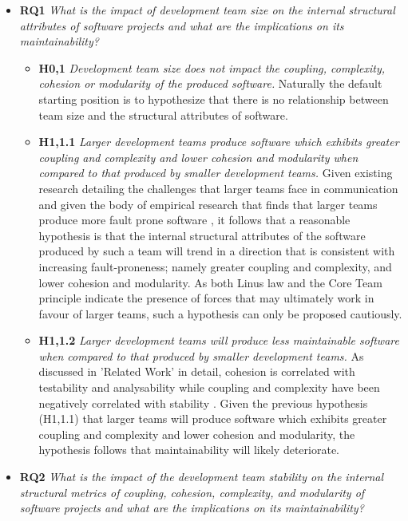 \begin{itemize}
\item  \textbf{RQ1} \textit{What is the impact of development team size on the internal structural attributes of software projects and what are the implications on its maintainability?}
\begin{itemize}
\item \textbf{H0,1} \textit{Development team size does not impact the coupling, complexity, cohesion or modularity of the produced software.} Naturally the default starting position is to hypothesize that there is no relationship between team size and the structural attributes of software. 
\item \textbf{H1,1.1} \textit{Larger development teams produce software which exhibits greater coupling and complexity and lower cohesion and modularity when compared to that produced by smaller development teams.} Given existing research detailing the challenges that larger teams face in communication \citep{brooks1986mythical} and given the body of empirical research that finds that larger teams produce more fault prone software \citep{weyuker2008too, nagappan2008influence, meneely2009secure, foucault2015usefulness}, it follows that a reasonable hypothesis is that the internal structural attributes of the software produced by such a team will trend in a direction that is consistent with increasing fault-proneness; namely greater coupling and complexity, and lower cohesion and modularity. As both Linus law and the Core Team principle indicate the presence of forces that may ultimately work in favour of larger teams, such a hypothesis can only be proposed cautiously.
\item \textbf{H1,1.2} \textit{Larger development teams will produce less maintainable software when compared to that produced by smaller development teams.} As discussed in 'Related Work' in detail, cohesion is correlated with testability \citep{badri2011empirical} and analysability \citep{boehm1978characteristics} while coupling and complexity have been negatively correlated with stability \citep{elish2003investigation}. Given the previous hypothesis (H1,1.1) that larger teams will produce software which exhibits greater coupling and complexity and lower cohesion and modularity, the hypothesis follows that maintainability will likely deteriorate.
\end{itemize}
\item \textbf{RQ2} \textit{What is the impact of the development team stability on the internal structural metrics of coupling, cohesion, complexity, and modularity of software projects and what are the implications on its maintainability?}

\end{itemize}
